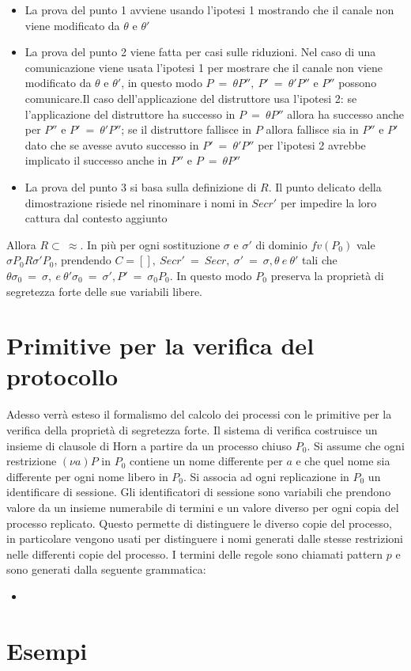 \documentclass[12pt]{report}
\begin{document}
\begin{itemize}
    \item La prova del punto 1 avviene usando l'ipotesi 1 mostrando che il canale non viene modificato da $\theta$ e $\theta'$
    \item La prova del punto 2 viene fatta per casi sulle riduzioni. Nel caso di una comunicazione viene usata l'ipotesi 1 per mostrare che il canale non viene modificato da $\theta$ e $\theta'$, in questo modo $ P\ =\ \theta P'',\ P'\ =\ \theta'P'' $ e $P''$ possono comunicare.Il caso dell'applicazione del distruttore usa l'ipotesi 2: se l'applicazione del distruttore ha successo in $P\ =\ \theta P''$ allora ha successo anche per $P''$ e $P'\ =\ \theta'P''$; se il distruttore fallisce in $P$ allora fallisce sia in $P''$ e $P'$ dato che se avesse avuto successo in $P'\ =\ \theta'P''$ per l'ipotesi 2 avrebbe implicato il successo anche in $P''$ e $P\ =\ \theta P''$
    \item La prova del punto 3 si basa sulla definizione di $R$. Il punto delicato della dimostrazione risiede nel rinominare i nomi in $Secr'$ per impedire la loro cattura dal contesto aggiunto
\end{itemize}
Allora $R \subset \ \approx$. In più per ogni sostituzione $\sigma$ e $\sigma'$ di dominio $fv(P_0)$ vale $\sigma P_0 R \sigma'P_0$, prendendo $C=[],\ Secr'\ =\ Secr,\ \sigma'\ =\ \sigma, \theta \ e\ \theta'$ tali che $\theta \sigma_0 \ =\ \sigma,\ e\ \theta'\sigma_0\ =\ \sigma', P'\ =\ \sigma_0 P_0$. In questo modo $P_0$ preserva la proprietà di segretezza forte delle sue variabili libere.

\section*{Primitive per la verifica del protocollo}
Adesso verrà esteso il formalismo del calcolo dei processi con le primitive per la verifica della proprietà di segretezza forte. Il sistema di verifica costruisce un insieme di clausole di Horn a partire da un processo chiuso $P_0$. Si assume che ogni restrizione $(\nu a)P$ in $P_0$ contiene un nome differente per $a$ e che quel nome sia differente per ogni nome libero in $P_0$. Si associa ad ogni replicazione in $P_0$ un identificare di sessione. Gli identificatori di sessione sono variabili che prendono valore da un insieme numerabile di termini e un valore diverso per ogni copia del processo replicato. Questo permette di distinguere le diverso copie del processo, in particolare vengono usati per distinguere i nomi generati dalle stesse restrizioni nelle differenti copie del processo. I termini delle regole sono chiamati pattern $p$ e sono generati dalla seguente grammatica:
\begin{itemize}
    \item 
\end{itemize}

\section*{Esempi}
\end{document}
